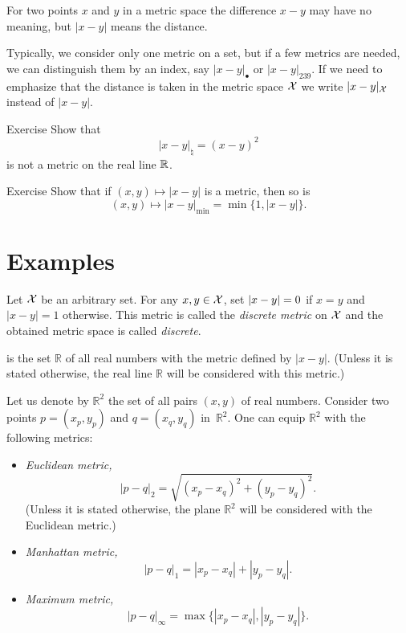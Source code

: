 For two points $x$ and $y$ in a metric space the difference $x-y$ may have no meaning,
but $|x-y|$ means the distance.

Typically, we consider only one metric on a set,
but if a few metrics are needed, we can distinguish them by an index, say  $|x-y|_{\bullet}$ or $|x-y|_{239}$.
If we need to emphasize that the distance is taken in the metric space $\mathcal{X}$ we write $|x-y|_{\mathcal{X}}$ instead of $|x-y|$.

\begin{thm}{Exercise}\label{ex:not-a-metric}
Show that 
\[|x-y|_{\natural}=(x-y)^2\]
is not a metric on the real line $\mathbb{R}$.
\end{thm}

\begin{thm}{Exercise}\label{ex:metric}
Show that if $(x,y)\mapsto |{x}-{y}|$ is a metric, then so is 
\[(x,y)\mapsto |{x}-{y}|_{\min}=\min\{1,|{x}-{y}|\}.\]
\end{thm}

\section{Examples}\label{sec:examples(metric-spaces)}


\label{page:Discrete metric}
Let $\mathcal{X}$ be an arbitrary set.
For any $x,y\z\in\c{X}$,
set $|x-y|\z=0$ if $x=y$ and $|x-y|=1$ otherwise.
This metric is called the \emph{discrete metric} on $\mathcal{X}$ and the obtained metric space is called {}\emph{discrete}.

is the set $\mathbb{R}$ of all real numbers with the metric defined by $|x-y|$.
(Unless it is stated otherwise, the real line $\mathbb{R}$ will be considered with this metric.)

\label{page:Metrics on the plane}
Let us denote by $\mathbb{R}^2$ the set of all pairs $(x,y)$ of real numbers.
Consider two points $p=(x_p,y_p)$ and $q=(x_q,y_q)$  in~$\mathbb{R}^2$.
One can equip $\mathbb{R}^2$ with the following metrics:
\begin{itemize}
\item{}\emph{Euclidean metric,} 
$$|p-q|_2=\sqrt{(x_p-x_q)^2+(y_p-y_q)^2}.$$
(Unless it is stated otherwise, the plane $\mathbb{R}^2$ will be considered with the Euclidean metric.)
\item\label{Manhattan plane}\emph{Manhattan metric,}  
$$|p-q|_1=|x_p-x_q|+|y_p-y_q|.$$
\item{}\emph{Maximum metric,} 
$$|p-q|_\infty=\max\{|x_p-x_q|,|y_p-y_q|\}.$$
\end{itemize}


